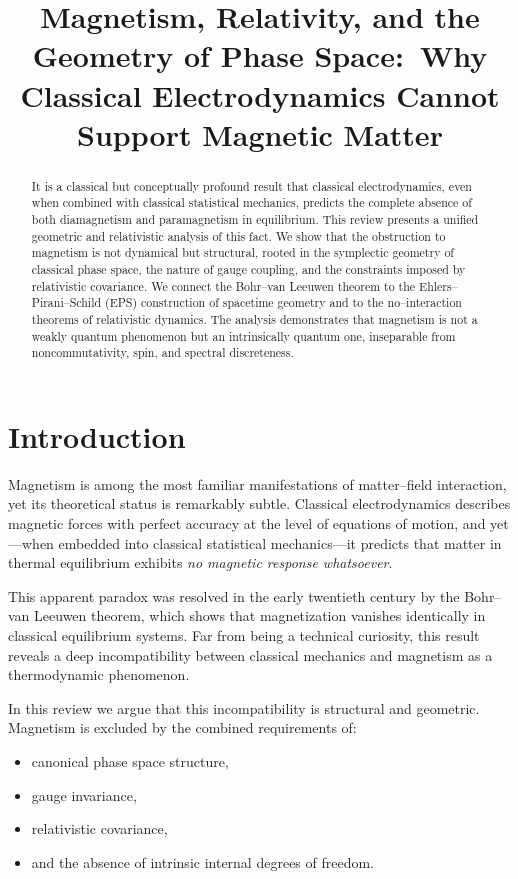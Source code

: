 \documentclass[11pt]{article}
\title{\textbf{Magnetism, Relativity, and the Geometry of Phase Space:\
Why Classical Electrodynamics Cannot Support Magnetic Matter}}
\author{}
\date{}
\begin{document}
\maketitle

\begin{abstract}
It is a classical but conceptually profound result that classical electrodynamics, even when combined with classical statistical mechanics, predicts the complete absence of both diamagnetism and paramagnetism in equilibrium. This review presents a unified geometric and relativistic analysis of this fact. We show that the obstruction to magnetism is not dynamical but structural, rooted in the symplectic geometry of classical phase space, the nature of gauge coupling, and the constraints imposed by relativistic covariance. We connect the Bohr–van Leeuwen theorem to the Ehlers–Pirani–Schild (EPS) construction of spacetime geometry and to the no–interaction theorems of relativistic dynamics. The analysis demonstrates that magnetism is not a weakly quantum phenomenon but an intrinsically quantum one, inseparable from noncommutativity, spin, and spectral discreteness.
\end{abstract}

\tableofcontents


\section{Introduction}

Magnetism is among the most familiar manifestations of matter–field interaction, yet its theoretical status is remarkably subtle. Classical electrodynamics describes magnetic forces with perfect accuracy at the level of equations of motion, and yet—when embedded into classical statistical mechanics—it predicts that matter in thermal equilibrium exhibits \emph{no magnetic response whatsoever}.

This apparent paradox was resolved in the early twentieth century by the Bohr–van Leeuwen theorem, which shows that magnetization vanishes identically in classical equilibrium systems. Far from being a technical curiosity, this result reveals a deep incompatibility between classical mechanics and magnetism as a thermodynamic phenomenon.

In this review we argue that this incompatibility is structural and geometric. Magnetism is excluded by the combined requirements of:
\begin{itemize}
\item canonical phase space structure,
\item gauge invariance,
\item relativistic covariance,
\item and the absence of intrinsic internal degrees of freedom.
\end{itemize}
\end{document}
